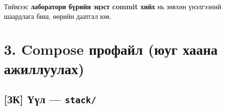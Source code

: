 Тиймээс \textbf{лаборатори бүрийн эцэст commit хийх} нь зөвхөн үнэлгээний шаардлага биш, өөрийн даатгал юм.

\hypertarget{compose-ux43fux440ux43eux444ux430ux439ux43b-ux44eux443ux433-ux445ux430ux430ux43dux430-ux430ux436ux438ux43bux43bux443ux443ux43bux430ux445}{%
\section{3. Compose профайл (юуг хаана ажиллуулах)}\label{compose-ux43fux440ux43eux444ux430ux439ux43b-ux44eux443ux433-ux445ux430ux430ux43dux430-ux430ux436ux438ux43bux43bux443ux443ux43bux430ux445}}

\hypertarget{ux437ux43a-ux4afux4afux43b-stack}{%
\subsection{\texorpdfstring{{[}ЗК{]} Үүл --- \texttt{stack/}}{{[}ЗК{]} Үүл --- stack/}}\label{ux437ux43a-ux4afux4afux43b-stack}}

